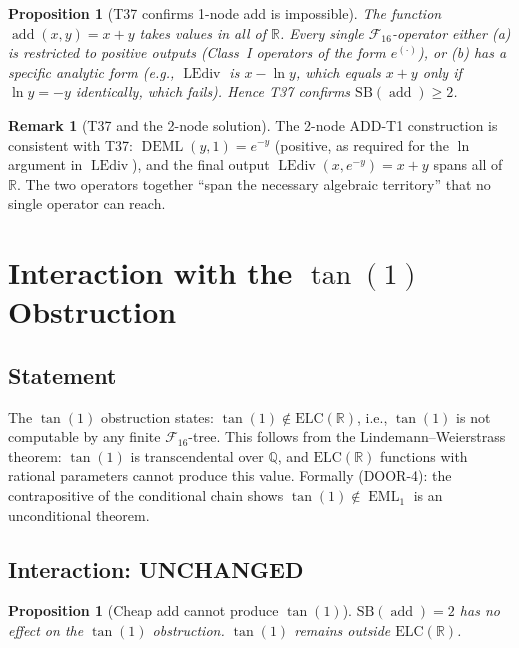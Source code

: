 \documentclass[12pt,a4paper]{article}
\newtheorem{proposition}[theorem]{Proposition}
\theoremstyle{definition}
\newtheorem{remark}[theorem]{Remark}
\newcommand{\EML}{\operatorname{EML}}
\newcommand{\DEML}{\operatorname{DEML}}
\newcommand{\LEdiv}{\operatorname{LEdiv}}
\newcommand{\addop}{\operatorname{add}}
\newcommand{\SB}{\mathrm{SB}}
\newcommand{\F}{\mathcal{F}_{16}}
\newcommand{\ELC}{\mathrm{ELC}(\mathbb{R})}
\newcommand{\R}{\mathbb{R}}
\newcommand{\Q}{\mathbb{Q}}
\newcommand{\Unchanged}{\textcolor{unchanged}{\textbf{UNCHANGED}}}
\begin{document}
\begin{proposition}[T37 confirms 1-node add is impossible]
The function $\addop(x,y)=x+y$ takes values in all of $\R$.  Every single
$\F$-operator either (a) is restricted to positive outputs (Class~I operators
of the form $e^{(\cdot)}$), or (b) has a specific analytic form (e.g., $\LEdiv$
is $x-\ln y$, which equals $x+y$ only if $\ln y = -y$ identically, which fails).
Hence T37 confirms $\SB(\addop)\geq 2$.
\end{proposition}

\begin{remark}[T37 and the 2-node solution]
The 2-node ADD-T1 construction is consistent with T37: $\DEML(y,1)=e^{-y}$
(positive, as required for the $\ln$ argument in $\LEdiv$), and the final
output $\LEdiv(x,e^{-y}) = x+y$ spans all of $\R$.
The two operators together ``span the necessary algebraic territory'' that no
single operator can reach.
\end{remark}

\section{Interaction with the $\tan(1)$ Obstruction}
\label{sec:tan1}

\subsection{Statement}

The $\tan(1)$ obstruction states:
$\tan(1) \notin \ELC$, i.e., $\tan(1)$ is not computable by any finite $\F$-tree.
This follows from the Lindemann--Weierstrass theorem: $\tan(1)$ is transcendental
over $\Q$, and $\ELC$ functions with rational parameters cannot produce this value.
Formally (DOOR-4): the contrapositive of the conditional chain shows
$\tan(1)\notin\EML_1$ is an unconditional theorem.

\subsection{Interaction: \Unchanged}

\begin{proposition}[Cheap add cannot produce $\tan(1)$]
$\SB(\addop)=2$ has no effect on the $\tan(1)$ obstruction.
$\tan(1)$ remains outside $\ELC$.
\end{proposition}
\end{document}
